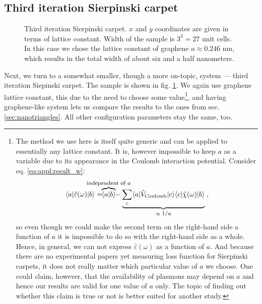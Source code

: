 \documentclass[a4paper,12pt]{article}
\begin{document}
\subsection{Third iteration Sierpinski carpet}
    \begin{figure}[h]
    \vspace{-0.5cm}
    
    \caption{Third iteration Sierpinski carpet. $x$ and $y$ coordinates are given in terms of lattice constant. Width of the sample is $3^3 = 27$ unit cells. In this case we chose the lattice constant of graphene $a \approx 0.246$ nm, which results in the total width of about six and a half nanometers.}
    \label{fig:coordinates-3rd-SC}
    \end{figure}
    Next, we turn to a somewhat smaller, though a more on-topic, system --- third iteration Siepinski carpet. The sample is shown in fig. \ref{fig:coordinates-3rd-SC}. We again use graphene lattice constant, this due to the need to choose some value\footnote{%
    The method we use here is itself quite generic and can be applied to essentially any lattice constant. It is, however impossible to keep $a$ as a variable due to its appearance in the Coulomb interaction potential. Consider eq. \eqref{eq:appl:result_w}:
    \begin{equation*}
        \langle a | \hat\varepsilon(\omega) | b \rangle
            = \!\!\!\!\!\!\!\!\!\!\!\!\!\!\! \overbrace{\langle a | b \rangle}^\text{\footnotesize independent of $a$} \!\!\!\!\!\!\!\!\!\!\!\!\!\! - \underbrace{\sum_{c} \langle a | \hat V_\text{Coulomb} | c \rangle \langle c | \hat\chi(\omega) | b \rangle}_\text{\footnotesize $\propto 1/a$} \; ,
    \end{equation*}
    so even though we could make the second term on the right-hand side a function of $a$ it is impossible to do so with the right-hand side as a whole. Hence, in general, we can not express $\hat\varepsilon(\omega)$ as a function of $a$. And because there are no experimental papers yet measuring loss function for Sierpinski carpets, it does not really matter which particular value of $a$ we choose. One could claim, however, that the availability of plasmons may depend on $a$ and hence our results are valid for one value of $a$ only. The topic of finding out whether this claim is true or not is better suited for another study.},
    and having graphene-like system lets us compare the results to the ones from sec. \ref{sec:nanotriangles}. All other configuration parameters stay the same, too.
     
\end{document}
